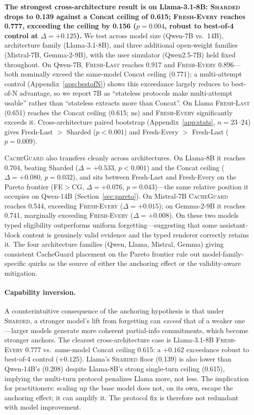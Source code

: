 \documentclass{article}
\begin{document}
\textbf{The strongest cross-architecture result is on Llama-3.1-8B: \textsc{Sharded} drops to 0.139 against a Concat ceiling of 0.615; \textsc{Fresh-Every} reaches 0.777, exceeding the ceiling by 0.156 ($p=0.004$, robust to best-of-4 control at $\Delta{=}{+}0.125$).} We test across model size (Qwen-7B vs.\ 14B), architecture family (Llama-3.1-8B), and three additional open-weight families (Mistral-7B, Gemma-2-9B), with the user simulator (Qwen2.5-7B) held fixed throughout. On Qwen-7B, \textsc{Fresh-Last} reaches 0.917 and \textsc{Fresh-Every} 0.896---both nominally exceed the same-model Concat ceiling (0.771); a multi-attempt control (Appendix~\ref{app:bestofN}) shows this exceedance largely reduces to best-of-N advantage, so we report 7B as ``stateless protocols make multi-attempt usable'' rather than ``stateless extracts more than Concat''. On Llama \textsc{Fresh-Last} (0.651) reaches the Concat ceiling (0.615; ns) and \textsc{Fresh-Every} significantly exceeds it. Cross-architecture paired bootstrap (Appendix~\ref{app:stats}, $n=23$--$24$) gives Fresh-Last $>$ Sharded ($p<0.001$) and Fresh-Every $>$ Fresh-Last ($p=0.009$).

\textsc{CacheGuard} also transfers cleanly across architectures. On Llama-8B it reaches 0.704, beating Sharded ($\Delta{=}{+}0.533$, $p<0.001$) and the Concat ceiling ($\Delta{=}{+}0.080$, $p=0.032$), and sits between Fresh-Last and Fresh-Every on the Pareto frontier (FE$>$CG, $\Delta{=}{+}0.076$, $p=0.043$)---the same relative position it occupies on Qwen-14B (Section~\ref{sec:pareto}). On Mistral-7B \textsc{CacheGuard} reaches 0.544, exceeding \textsc{Fresh-Every} ($\Delta{=}+0.015$); on Gemma-2-9B it reaches 0.741, marginally exceeding \textsc{Fresh-Every} ($\Delta{=}+0.008$). On these two models typed eligibility outperforms uniform forgetting---suggesting that some assistant-block content is genuinely valid evidence and the typed renderer correctly retains it. The four architecture families (Qwen, Llama, Mistral, Gemma) giving consistent CacheGuard placement on the Pareto frontier rule out model-family-specific quirks as the source of either the anchoring effect or the validity-aware mitigation.

\paragraph{Capability inversion.}
A counterintuitive consequence of the anchoring hypothesis is that under \textsc{Sharded}, a stronger model's lift from forgetting can \emph{exceed} that of a weaker one---larger models generate more coherent partial-info commitments, which become stronger anchors. The clearest cross-architecture case is Llama-3.1-8B \textsc{Fresh-Every} 0.777 vs.\ same-model Concat ceiling 0.615: a $+0.162$ exceedance robust to best-of-4 control ($+0.125$). Llama's \textsc{Sharded} floor (0.139) is also lower than Qwen-14B's (0.208) despite Llama-8B's strong single-turn ceiling (0.615), implying the multi-turn protocol penalizes Llama more, not less. The implication for practitioners: scaling up the base model does not, on its own, escape the anchoring effect; it can amplify it. The protocol fix is therefore not redundant with model improvement.
\end{document}
